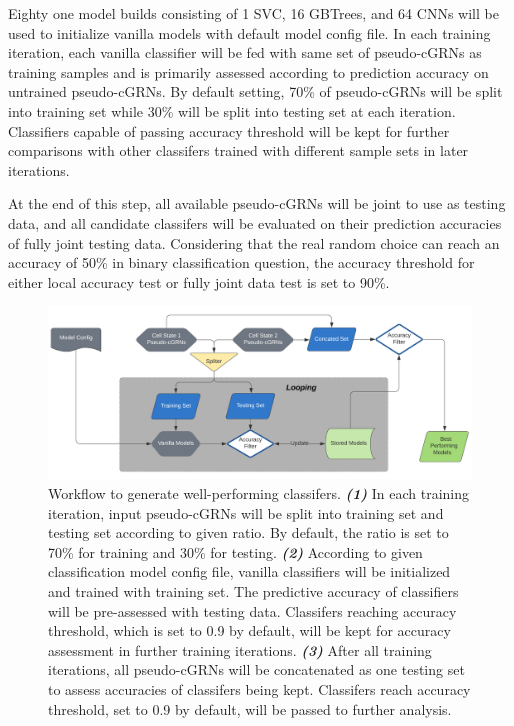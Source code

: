 \documentclass[fleqn,10pt]{wlscirep}
\begin{document}
Eighty one model builds consisting of 1 SVC, 16 GBTrees, and 64 CNNs will be used to initialize vanilla models with default model config file.
In each training iteration, each vanilla classifier will be fed with same set of pseudo-cGRNs as training samples and is primarily assessed according to prediction accuracy on untrained pseudo-cGRNs.
By default setting, 70\% of pseudo-cGRNs will be split into training set while 30\% will be split into testing set at each iteration.
Classifiers capable of passing accuracy threshold will be kept for further comparisons with other classifers trained with different sample sets in later iterations.

At the end of this step, all available pseudo-cGRNs will be joint to use as testing data, and all candidate classifers will be evaluated on their prediction accuracies of fully joint testing data.
Considering that the real random choice can reach an accuracy of 50\% in binary classification question, the accuracy threshold for either local accuracy test or fully joint data test is set to 90\%.

\begin{figure}[ht]
\centering
\includegraphics[width=1.0\linewidth]{image/Odysseus.png}
\caption{
Workflow to generate well-performing classifers.
\textbf{\emph{(1)}} In each training iteration, input pseudo-cGRNs will be split into training set and testing set according to given ratio.
By default, the ratio is set to 70\% for training and 30\% for testing.
\textbf{\emph{(2)}} According to given classification model config file, vanilla classifiers will be initialized and trained with training set.
The predictive accuracy of classifiers will be pre-assessed with testing data.
Classifers reaching accuracy threshold, which is set to 0.9 by default, will be kept for accuracy assessment in further training iterations.
\textbf{\emph{(3)}} After all training iterations, all pseudo-cGRNs will be concatenated as one testing set to assess accuracies of classifers being kept.
Classifers reach accuracy threshold, set to 0.9 by default, will be passed to further analysis.
}
\label{odysseus}
\end{figure}
\end{document}
